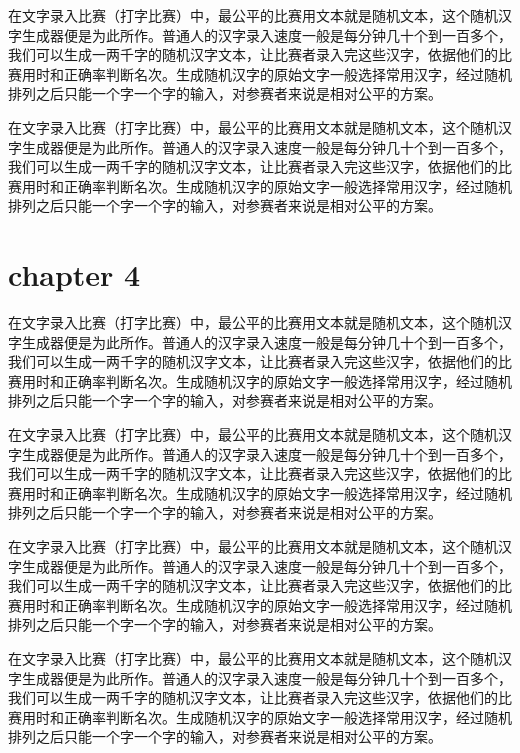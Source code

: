 \documentclass[12pt,hyperref,UTF8]{ctexbook}
\begin{document}
在文字录入比赛（打字比赛）中，最公平的比赛用文本就是随机文本，这个随机汉字生成器便是为此所作。普通人的汉字录入速度一般是每分钟几十个到一百多个，我们可以生成一两千字的随机汉字文本，让比赛者录入完这些汉字，依据他们的比赛用时和正确率判断名次。生成随机汉字的原始文字一般选择常用汉字，经过随机排列之后只能一个字一个字的输入，对参赛者来说是相对公平的方案。

在文字录入比赛（打字比赛）中，最公平的比赛用文本就是随机文本，这个随机汉字生成器便是为此所作。普通人的汉字录入速度一般是每分钟几十个到一百多个，我们可以生成一两千字的随机汉字文本，让比赛者录入完这些汉字，依据他们的比赛用时和正确率判断名次。生成随机汉字的原始文字一般选择常用汉字，经过随机排列之后只能一个字一个字的输入，对参赛者来说是相对公平的方案。

\cleardoublepage
\chapter{chapter 4}



在文字录入比赛（打字比赛）中，最公平的比赛用文本就是随机文本，这个随机汉字生成器便是为此所作。普通人的汉字录入速度一般是每分钟几十个到一百多个，我们可以生成一两千字的随机汉字文本，让比赛者录入完这些汉字，依据他们的比赛用时和正确率判断名次。生成随机汉字的原始文字一般选择常用汉字，经过随机排列之后只能一个字一个字的输入，对参赛者来说是相对公平的方案。

在文字录入比赛（打字比赛）中，最公平的比赛用文本就是随机文本，这个随机汉字生成器便是为此所作。普通人的汉字录入速度一般是每分钟几十个到一百多个，我们可以生成一两千字的随机汉字文本，让比赛者录入完这些汉字，依据他们的比赛用时和正确率判断名次。生成随机汉字的原始文字一般选择常用汉字，经过随机排列之后只能一个字一个字的输入，对参赛者来说是相对公平的方案。

在文字录入比赛（打字比赛）中，最公平的比赛用文本就是随机文本，这个随机汉字生成器便是为此所作。普通人的汉字录入速度一般是每分钟几十个到一百多个，我们可以生成一两千字的随机汉字文本，让比赛者录入完这些汉字，依据他们的比赛用时和正确率判断名次。生成随机汉字的原始文字一般选择常用汉字，经过随机排列之后只能一个字一个字的输入，对参赛者来说是相对公平的方案。

在文字录入比赛（打字比赛）中，最公平的比赛用文本就是随机文本，这个随机汉字生成器便是为此所作。普通人的汉字录入速度一般是每分钟几十个到一百多个，我们可以生成一两千字的随机汉字文本，让比赛者录入完这些汉字，依据他们的比赛用时和正确率判断名次。生成随机汉字的原始文字一般选择常用汉字，经过随机排列之后只能一个字一个字的输入，对参赛者来说是相对公平的方案。
\end{document}
